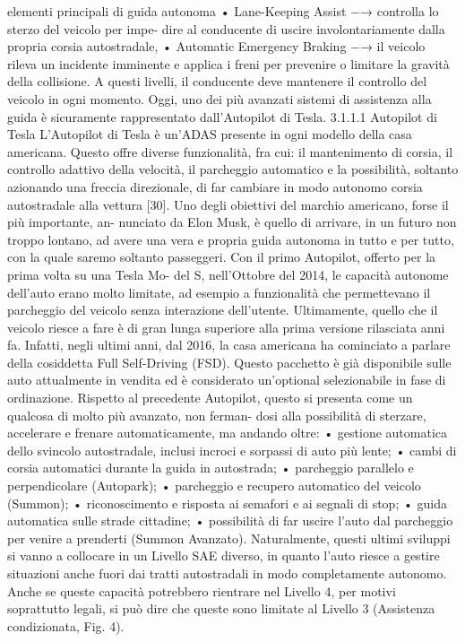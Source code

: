 \documentclass[14pt]{extarticle}
\begin{document}
\begin{itemize}
elementi principali di guida autonoma
• Lane-Keeping Assist −→ controlla lo sterzo del veicolo per impe-
dire al conducente di uscire involontariamente dalla propria corsia
autostradale,
• Automatic Emergency Braking −→ il veicolo rileva un incidente
imminente e applica i freni per prevenire o limitare la gravità della
collisione.
A questi livelli, il conducente deve mantenere il controllo del veicolo in
ogni momento.
Oggi, uno dei più avanzati sistemi di assistenza alla guida è sicuramente
rappresentato dall’Autopilot di Tesla.
3.1.1.1 Autopilot di Tesla
L’Autopilot di Tesla è un’ADAS presente in ogni modello della casa
americana. Questo offre diverse funzionalità, fra cui: il mantenimento di
corsia, il controllo adattivo della velocità, il parcheggio automatico e la
possibilità, soltanto azionando una freccia direzionale, di far cambiare in
modo autonomo corsia autostradale alla vettura [30].
Uno degli obiettivi del marchio americano, forse il più importante, an-
nunciato da Elon Musk, è quello di arrivare, in un futuro non troppo
lontano, ad avere una vera e propria guida autonoma in tutto e per tutto,
con la quale saremo soltanto passeggeri.
Con il primo Autopilot, offerto per la prima volta su una Tesla Mo-
del S, nell’Ottobre del 2014, le capacità autonome dell’auto erano molto
limitate, ad esempio a funzionalità che permettevano il parcheggio del
veicolo senza interazione dell’utente. Ultimamente, quello che il veicolo
riesce a fare è di gran lunga superiore alla prima versione rilasciata anni
fa. Infatti, negli ultimi anni, dal 2016, la casa americana ha cominciato a
parlare della cosiddetta Full Self-Driving (FSD). Questo pacchetto è già
disponibile sulle auto attualmente in vendita ed è considerato un’optional
selezionabile in fase di ordinazione. Rispetto al precedente Autopilot,
questo si presenta come un qualcosa di molto più avanzato, non ferman-
dosi alla possibilità di sterzare, accelerare e frenare automaticamente, ma
andando oltre:
• gestione automatica dello svincolo autostradale, inclusi incroci e
sorpassi di auto più lente;
• cambi di corsia automatici durante la guida in autostrada;
• parcheggio parallelo e perpendicolare (Autopark);
• parcheggio e recupero automatico del veicolo (Summon);
• riconoscimento e risposta ai semafori e ai segnali di stop;
• guida automatica sulle strade cittadine;
• possibilità di far uscire l’auto dal parcheggio per venire a prenderti
(Summon Avanzato).
Naturalmente, questi ultimi sviluppi si vanno a collocare in un Livello
SAE diverso, in quanto l’auto riesce a gestire situazioni anche fuori dai
tratti autostradali in modo completamente autonomo. Anche se queste
capacità potrebbero rientrare nel Livello 4, per motivi soprattutto legali, si
può dire che queste sono limitate al Livello 3 (Assistenza condizionata,
Fig. 4).


\end{itemize}
\end{document}
